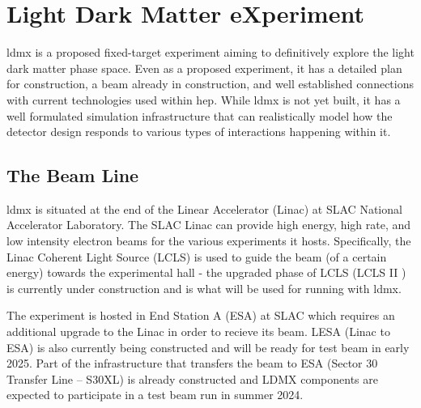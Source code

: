 \chapter{Light Dark Matter eXperiment}
\label{chapter:ldmx:experiment}

\ac{ldmx} is a proposed fixed-target experiment aiming to definitively explore
the light dark matter phase space. Even as a proposed experiment, it has a detailed
plan for construction, a beam already in construction, and well established connections
with current technologies used within \ac{hep}. While \ac{ldmx} is not yet built,
it has a well formulated simulation infrastructure that can realistically model
how the detector design responds to various types of interactions happening within it.

\section{The Beam Line}
\ac{ldmx} is situated at the end of the Linear Accelerator (Linac) at SLAC National Accelerator
Laboratory. The SLAC Linac can provide high energy, high rate, and low intensity electron beams for
the various experiments it hosts. Specifically, the Linac Coherent Light Source (LCLS) is
used to guide the beam (of a certain energy) towards the experimental hall - the upgraded
phase of LCLS (LCLS II \cite{lcls-ii}) is currently under construction and is what will
be used for running with \ac{ldmx}.

The experiment is hosted in End Station A (ESA) at SLAC which requires an additional upgrade to the
Linac in order to recieve its beam. LESA (Linac to ESA) \cite{lesa-design} is also currently being
constructed and will be ready for test beam in early 2025. Part of the infrastructure that
transfers the beam to ESA (Sector 30 Transfer Line -- S30XL) is already constructed and LDMX
components are expected to participate in a test beam run in summer 2024.

